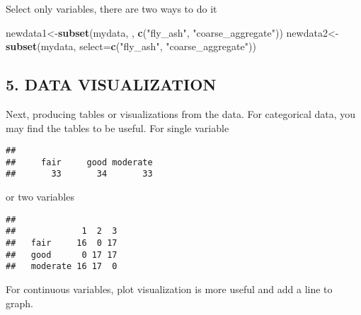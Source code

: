 \documentclass[]{article}
\newenvironment{Shaded}{\begin{snugshade}}{\end{snugshade}}
\newcommand{\DataTypeTok}[1]{\textcolor[rgb]{0.13,0.29,0.53}{#1}}
\newcommand{\KeywordTok}[1]{\textcolor[rgb]{0.13,0.29,0.53}{\textbf{#1}}}
\newcommand{\NormalTok}[1]{#1}
\newcommand{\OperatorTok}[1]{\textcolor[rgb]{0.81,0.36,0.00}{\textbf{#1}}}
\newcommand{\StringTok}[1]{\textcolor[rgb]{0.31,0.60,0.02}{#1}}
\begin{document}
Select only variables, there are two ways to do it

\begin{Shaded}
\begin{Highlighting}[]
\NormalTok{newdata1<-}\KeywordTok{subset}\NormalTok{(mydata, , }\KeywordTok{c}\NormalTok{(}\StringTok{"fly_ash"}\NormalTok{, }\StringTok{"coarse_aggregate"}\NormalTok{))}
\NormalTok{newdata2<-}\KeywordTok{subset}\NormalTok{(mydata, }\DataTypeTok{select=}\KeywordTok{c}\NormalTok{(}\StringTok{"fly_ash"}\NormalTok{, }\StringTok{"coarse_aggregate"}\NormalTok{))}
\end{Highlighting}
\end{Shaded}

\hypertarget{data-visualization}{%
\subsection{5. DATA VISUALIZATION}\label{data-visualization}}

Next, producing tables or visualizations from the data. For categorical
data, you may find the tables to be useful. For single variable

\begin{Shaded}
\end{Shaded}

\begin{verbatim}
## 
##     fair     good moderate 
##       33       34       33
\end{verbatim}

or two variables

\begin{Shaded}
\end{Shaded}

\begin{verbatim}
##           
##             1  2  3
##   fair     16  0 17
##   good      0 17 17
##   moderate 16 17  0
\end{verbatim}

For continuous variables, plot visualization is more useful and add a
line to graph.

\begin{Shaded}
\end{Shaded}
\end{document}
